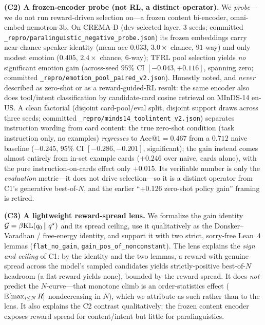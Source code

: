 \textbf{(C2) A frozen-encoder probe (not RL, a distinct operator).} We \emph{probe}---we do not run reward-driven selection on---a frozen content bi-encoder, omni-embed-nemotron-3b. On CREMA-D (dev-selected layer, $3$ seeds; committed \texttt{\_repro/paralinguistic\_negative\_probe.json}) its frozen embeddings carry near-chance speaker identity (mean acc $0.033$, $3.0\times$ chance, $91$-way) and only modest emotion ($0.405$, $2.4\times$ chance, $6$-way); TFRL pool selection yields \emph{no} significant emotion gain (across-seed $95\%$ CI $[-0.043,+0.116]$, spanning zero; committed \texttt{\_repro/emotion\_pool\_paired\_v2.json}). Honestly noted, and \emph{never} described as zero-shot or as a reward-guided-RL result: the same encoder also does tool/intent classification by candidate-card cosine retrieval on MInDS-14 en-US. A clean factorial (disjoint card-pool/eval split, disjoint support draws across three seeds; committed \texttt{\_repro/minds14\_toolintent\_v2.json}) separates instruction wording from card content: the true zero-shot condition (task instruction only, no examples) \emph{regresses} to $\mathrm{Acc@1}=0.467$ from a $0.712$ naive baseline ($-0.245$, $95\%$ CI $[-0.286,-0.201]$, significant); the gain instead comes almost entirely from in-set example cards ($+0.246$ over naive, cards alone), with the pure instruction-on-cards effect only $+0.015$. Its verifiable number is only the \emph{evaluation} metric---it does not drive selection---so it is a distinct operator from C1's generative best-of-$N$, and the earlier ``+0.126 zero-shot policy gain'' framing is retired.

\textbf{(C3) A lightweight reward-spread lens.} We formalize the gain identity $\mathcal{G}=\beta\mathrm{KL}\!\left(q_{0} \,\|\, q^{\star}\right)$ and its spread ceiling, use it qualitatively as the Donsker--Varadhan / free-energy identity, and support it with two strict, sorry-free Lean~4 lemmas (\texttt{flat\_no\_gain}, \texttt{gain\_pos\_of\_nonconstant}). The lens explains the \emph{sign and ceiling} of C1: by the identity and the two lemmas, a reward with genuine spread across the model's sampled candidates yields strictly-positive best-of-$N$ headroom (a flat reward yields none), bounded by the reward spread. It does \emph{not} predict the $N$-curve---that monotone climb is an order-statistics effect ($\mathbb{E}[\max_{i\le N}R]$ nondecreasing in $N$), which we attribute as such rather than to the lens. It also explains the C2 contrast qualitatively: the frozen content encoder exposes reward spread for content/intent but little for paralinguistics.


